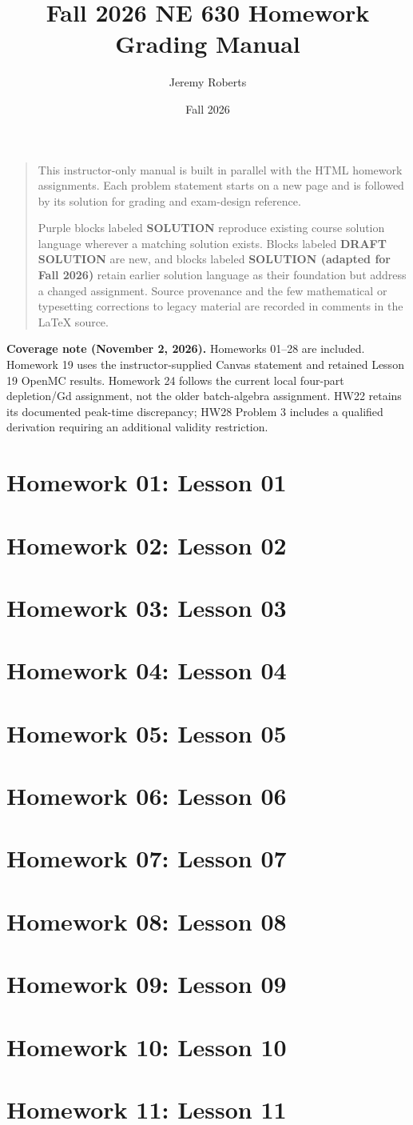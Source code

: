 \documentclass[11pt]{amsart}
\title{Fall 2026 NE 630 Homework Grading Manual}
\author{Jeremy Roberts}
\date{Fall 2026}
\newcommand{\HomeworkSection}[1]{\clearpage\section{#1}}
\begin{document}
\maketitle
\thispagestyle{empty}

\begin{quote}\small
This instructor-only manual is built in parallel with the HTML homework
assignments.  Each problem statement starts on a new page and is followed by
its solution for grading and exam-design reference.

Purple blocks labeled \textbf{SOLUTION} reproduce existing course solution
language wherever a matching solution exists.  Blocks labeled
\textbf{DRAFT SOLUTION} are new, and blocks labeled \textbf{SOLUTION (adapted
for Fall 2026)} retain earlier solution language as their foundation but
address a changed assignment.  Source provenance and the few mathematical or
typesetting corrections to legacy material are recorded in comments in the
LaTeX source.
\end{quote}

\noindent\textbf{Coverage note (November 2, 2026).} Homeworks 01--28 are included.
Homework 19 uses the instructor-supplied Canvas statement and retained
Lesson 19 OpenMC results. Homework 24 follows the current local four-part
depletion/Gd assignment, not the older batch-algebra assignment.
HW22 retains its documented peak-time discrepancy; HW28 Problem 3 includes
a qualified derivation requiring an additional validity restriction.

\tableofcontents

\HomeworkSection{Homework 01: Lesson 01}


\HomeworkSection{Homework 02: Lesson 02}


\HomeworkSection{Homework 03: Lesson 03}


\HomeworkSection{Homework 04: Lesson 04}


\HomeworkSection{Homework 05: Lesson 05}


\HomeworkSection{Homework 06: Lesson 06}


\HomeworkSection{Homework 07: Lesson 07}


\HomeworkSection{Homework 08: Lesson 08}


\HomeworkSection{Homework 09: Lesson 09}


\HomeworkSection{Homework 10: Lesson 10}


\HomeworkSection{Homework 11: Lesson 11}

\end{document}

